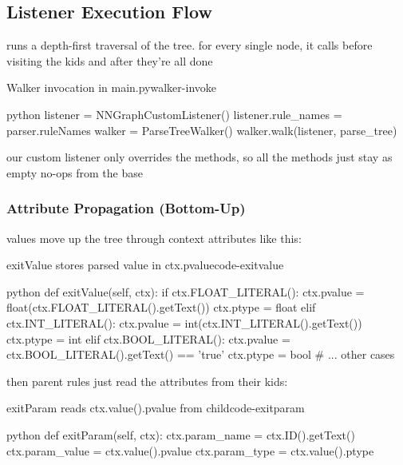 \documentclass{nngraph-en}
\begin{document}
\subsection{Listener Execution Flow}

 runs a depth-first traversal of the tree. for every single node, it calls  before visiting the kids and  after they're all done

\begin{dfnbox}{Walker invocation in main.py}{walker-invoke}
\begin{amzcode}{python}
listener = NNGraphCustomListener()
listener.rule_names = parser.ruleNames
walker = ParseTreeWalker()
walker.walk(listener, parse_tree)
\end{amzcode}
\end{dfnbox}

our custom listener only overrides the  methods, so all the  methods just stay as empty no-ops from the base 

\subsubsection{Attribute Propagation (Bottom-Up)}

values move up the tree through context attributes like this:

\begin{codebox}{exitValue stores parsed value in ctx.pvalue}{code-exitvalue}
\begin{amzcode}{python}
def exitValue(self, ctx):
    if ctx.FLOAT_LITERAL():
        ctx.pvalue = float(ctx.FLOAT_LITERAL().getText())
        ctx.ptype  = float
    elif ctx.INT_LITERAL():
        ctx.pvalue = int(ctx.INT_LITERAL().getText())
        ctx.ptype  = int
    elif ctx.BOOL_LITERAL():
        ctx.pvalue = ctx.BOOL_LITERAL().getText() == 'true'
        ctx.ptype  = bool
    # ... other cases
\end{amzcode}
\end{codebox}

then parent rules just read the attributes from their kids:

\begin{codebox}{exitParam reads ctx.value().pvalue from child}{code-exitparam}
\begin{amzcode}{python}
def exitParam(self, ctx):
    ctx.param_name  = ctx.ID().getText()
    ctx.param_value = ctx.value().pvalue
    ctx.param_type  = ctx.value().ptype
\end{amzcode}
\end{codebox}
\end{document}
